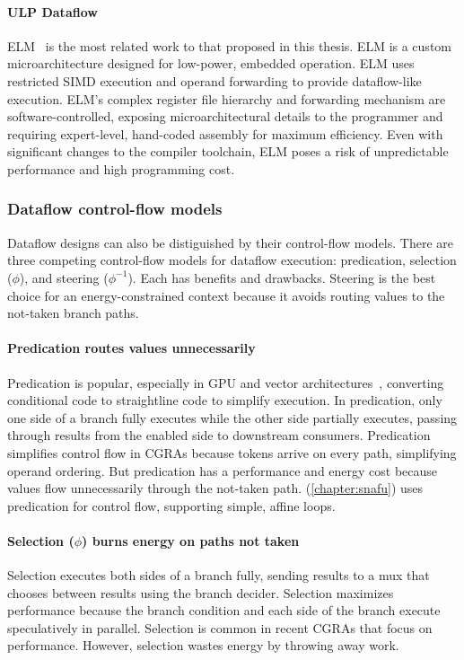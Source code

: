 \paragraph{ULP Dataflow}
ELM~\cite{balfour2008energy} is the most related work to that proposed in this thesis.  
% 
ELM is a custom microarchitecture designed for low-power, embedded operation. ELM uses
restricted SIMD execution and operand forwarding to provide
dataflow-like execution.
% 
ELM's complex register file hierarchy and forwarding
mechanism are software-controlled, exposing microarchitectural details to the
programmer and requiring expert-level, hand-coded assembly for maximum
efficiency.
% 
Even with significant changes to the compiler toolchain, ELM poses
a risk of unpredictable performance and high programming cost. 

\subsubsection{Dataflow control-flow models}
Dataflow designs can also be distiguished by their control-flow models.
% 
There are three competing control-flow models for dataflow execution: predication, selection ($\phi$), and steering ($\phi^{-1}$).
% 
Each has benefits and drawbacks. 
% 
Steering is the best choice for an energy-constrained context because it avoids routing values to
the not-taken branch paths.

\paragraph{Predication routes values unnecessarily}
Predication is popular, especially in GPU and vector
architectures~\cite{avx,hennessy2011computer}, converting conditional code to
straightline code to simplify execution.
% 
In predication, only one side of a branch fully executes while the other side partially executes, passing through results from the enabled side to downstream consumers.
%
Predication simplifies control flow in CGRAs because tokens arrive
on every path, simplifying operand ordering.
%
But predication has a performance and energy cost because values flow
unnecessarily through the not-taken path.
%
\snafu (\autoref{chapter:snafu}) uses predication for control flow, supporting simple, affine loops.

\paragraph{Selection ($\phi$) burns energy on paths not taken}
Selection executes both sides of a branch fully, sending results to a mux that
chooses between results using the branch decider.
%
Selection maximizes performance because the branch condition and each side of the branch execute speculatively in parallel.
%
Selection is common in recent CGRAs that focus on performance.
% 
However, selection wastes energy by throwing away work.

